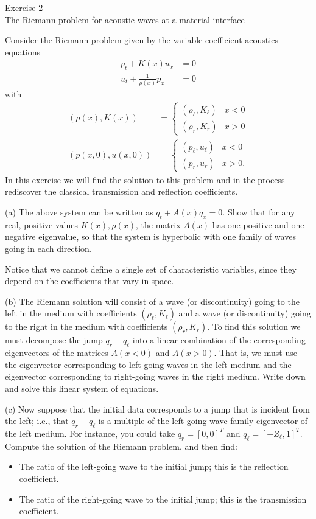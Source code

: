 \documentclass[12pt,english]{article}
\begin{document}
\begin{center}
{\large Exercise 2} \\
The Riemann problem for acoustic waves at a material interface
\par\end{center}{\large \par}

Consider the Riemann problem given by the variable-coefficient
acoustics equations
\begin{align}
p_t + K(x) u_x & = 0 \\
u_t + \frac{1}{\rho(x)} p_x & = 0
\end{align}
with
\begin{align}
(\rho(x), K(x)) & = \begin{cases} (\rho_\ell, K_\ell) & x < 0 \\ (\rho_r,K_r) & x > 0\end{cases} \\
(p(x,0),u(x,0)) & = \begin{cases} (p_\ell, u_\ell) & x < 0 \\ (p_r,u_r) & x > 0.\end{cases}
\end{align}
In this exercise we will find the solution to this problem and in the process rediscover
the classical transmission and reflection coefficients.

(a)  The above system can be written as $q_t + A(x)q_x = 0$.
Show that for any real, positive values $K(x), \rho(x)$, the matrix $A(x)$ has
one positive and one negative eigenvalue, so that the system is hyperbolic with
one family of waves going in each direction.

Notice that we cannot define a single set of characteristic variables, since they depend
on the coefficients that vary in space.

(b)  The Riemann solution will consist of a wave (or discontinuity) going to the left in the medium
with coefficients $(\rho_\ell, K_\ell)$ and a wave (or discontinuity) going to the right
in the medium with coefficients $(\rho_r, K_r)$.  To find this solution we must decompose the
jump $q_r - q_\ell$ into a linear combination of the corresponding eigenvectors of the matrices
$A(x<0)$ and $A(x>0)$.  That is, we must use the eigenvector corresponding to left-going waves
in the left medium and the eigenvector corresponding to right-going waves in the right medium.
Write down and solve this linear system of equations.

(c) Now suppose that the initial data corresponds to a jump that is incident from the left;
i.e., that $q_r - q_\ell$ is a multiple of the left-going wave family eigenvector of the left medium.
For instance, you could take $q_r = [0,0]^T$ and $q_\ell = [-Z_\ell, 1]^T$.  Compute the solution of
the Riemann problem, and then find:

\begin{itemize}
    \item The ratio of the left-going wave to the initial jump; this is the reflection coefficient.
    \item The ratio of the right-going wave to the initial jump; this is the transmission coefficient.
\end{itemize}
\end{document}
